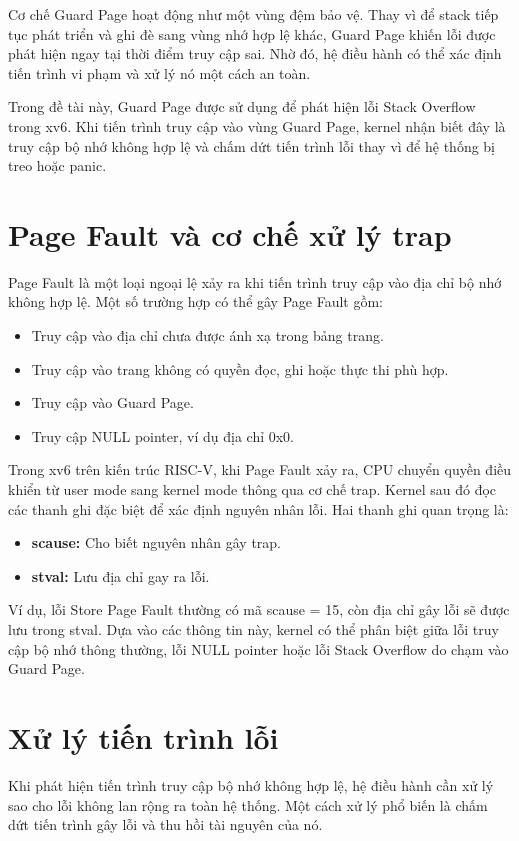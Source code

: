Cơ chế Guard Page hoạt động như một vùng đệm bảo vệ. Thay vì để stack tiếp tục phát triển và ghi đè sang vùng nhớ hợp lệ khác, Guard Page khiến lỗi được phát hiện ngay tại thời điểm truy cập sai. Nhờ đó, hệ điều hành có thể xác định tiến trình vi phạm và xử lý nó một cách an toàn.

Trong đề tài này, Guard Page được sử dụng để phát hiện lỗi Stack Overflow trong xv6. Khi tiến trình truy cập vào vùng Guard Page, kernel nhận biết đây là truy cập bộ nhớ không hợp lệ và chấm dứt tiến trình lỗi thay vì để hệ thống bị treo hoặc panic.

\section{Page Fault và cơ chế xử lý trap}
Page Fault là một loại ngoại lệ xảy ra khi tiến trình truy cập vào địa chỉ bộ nhớ không hợp lệ. Một số trường hợp có thể gây Page Fault gồm:
\begin{itemize}
    \item Truy cập vào địa chỉ chưa được ánh xạ trong bảng trang.
    \item Truy cập vào trang không có quyền đọc, ghi hoặc thực thi phù hợp.
    \item Truy cập vào Guard Page.
    \item Truy cập NULL pointer, ví dụ địa chỉ 0x0.
\end{itemize}
Trong xv6 trên kiến trúc RISC-V, khi Page Fault xảy ra, CPU chuyển quyền điều khiển từ user mode sang kernel mode thông qua cơ chế trap. Kernel sau đó đọc các thanh ghi đặc biệt để xác định nguyên nhân lỗi. Hai thanh ghi quan trọng là:
\begin{itemize}
    \item \textbf{scause:} Cho biết nguyên nhân gây trap.
    \item \textbf{stval:} Lưu địa chỉ gay ra lỗi.
\end{itemize}
Ví dụ, lỗi Store Page Fault thường có mã scause = 15, còn địa chỉ gây lỗi sẽ được lưu trong stval. Dựa vào các thông tin này, kernel có thể phân biệt giữa lỗi truy cập bộ nhớ thông thường, lỗi NULL pointer hoặc lỗi Stack Overflow do chạm vào Guard Page.
\section{Xử lý tiến trình lỗi}
Khi phát hiện tiến trình truy cập bộ nhớ không hợp lệ, hệ điều hành cần xử lý sao cho lỗi không lan rộng ra toàn hệ thống. Một cách xử lý phổ biến là chấm dứt tiến trình gây lỗi và thu hồi tài nguyên của nó.

